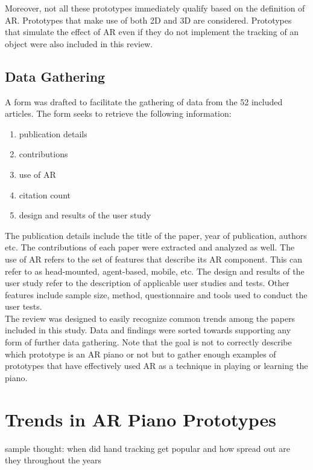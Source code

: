 \documentclass[manuscript,screen]{acmart}
\begin{document}
Moreover, not all these prototypes immediately qualify based on the definition of AR. Prototypes that make use of both 2D and 3D are considered. Prototypes that simulate the effect of AR even if they do not implement the tracking of an object were also included in this review. 

\subsection{Data Gathering}
A form was drafted to facilitate the gathering of data from the 52 included articles. The form seeks to retrieve the following information: 
\begin{enumerate}
    \item publication details
    \item contributions
    \item use of AR
    \item citation count
    \item design and results of the user study
\end{enumerate}
The publication details include the title of the paper, year of publication, authors etc. The contributions of each paper were extracted and analyzed as well. The use of AR refers to the set of features that describe its AR component. This can refer to as head-mounted, agent-based, mobile, etc. The design and results of the user study refer to the description of applicable user studies and tests. Other features include sample size, method, questionnaire and tools used to conduct the user tests. \\

The review was designed to easily recognize common trends among the papers included in this study. Data and findings were sorted towards supporting any form of further data gathering. Note that the goal is not to correctly describe which prototype is an AR piano or not but to gather enough examples of prototypes that have effectively used AR as a technique in playing or learning the piano.  
\section{Trends in AR Piano Prototypes}

sample thought: when did hand tracking get popular and how spread out are they throughout the years 
\end{document}
